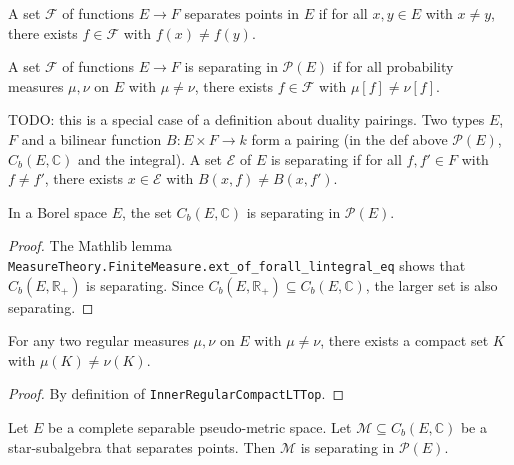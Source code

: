 \begin{definition}\label{def:separates_points}
 \leanok
A set $\mathcal F$ of functions $E \to F$ separates points in $E$ if for all $x, y \in E$ with $x \ne y$, there exists $f \in \mathcal F$ with $f(x) \ne f(y)$.
\end{definition}

\begin{definition}\label{def:separating}
A set $\mathcal F$ of functions $E \to F$ is separating in $\mathcal P(E)$ if for all probability measures $\mu, \nu$ on $E$ with $\mu \ne \nu$, there exists $f \in \mathcal F$ with $\mu[f] \ne \nu[f]$.
\end{definition}

TODO: this is a special case of a definition about duality pairings. Two types $E$, $F$ and a bilinear function $B : E \times F \to k$ form a pairing (in the def above $\mathcal P(E)$, $C_b(E, \mathbb{C})$ and the integral). A set $\mathcal E$ of $E$ is separating if for all $f, f' \in F$ with $f \ne f'$, there exists $x \in \mathcal E$ with $B(x, f) \ne B(x, f')$. 

\begin{lemma}\label{lem:bounded_continuous_separating}
In a Borel space $E$, the set $C_b(E, \mathbb{C})$ is separating in $\mathcal P(E)$.
\end{lemma}

\begin{proof}
The Mathlib lemma \texttt{MeasureTheory.FiniteMeasure.ext\_of\_forall\_lintegral\_eq} shows that $C_b(E, \mathbb{R}_+)$ is separating. Since $C_b(E, \mathbb{R}_{+}) \subseteq C_b(E, \mathbb{C})$, the larger set is also separating.
\end{proof}

\begin{lemma}\label{lem:innerRegular_ne_iff_compact}
For any two regular measures $\mu, \nu$ on $E$ with $\mu \ne \nu$, there exists a compact set $K$ with $\mu(K) \ne \nu(K)$.
\end{lemma}

\begin{proof}
By definition of \texttt{InnerRegularCompactLTTop}.
\end{proof}

\begin{theorem}\label{thm:separating_starSubalgebra}
Let $E$ be a complete separable pseudo-metric space. Let $\mathcal M \subseteq C_b(E, \mathbb{C})$ be a star-subalgebra that separates points. Then $\mathcal M$ is separating in $\mathcal P(E)$.
\end{theorem}

